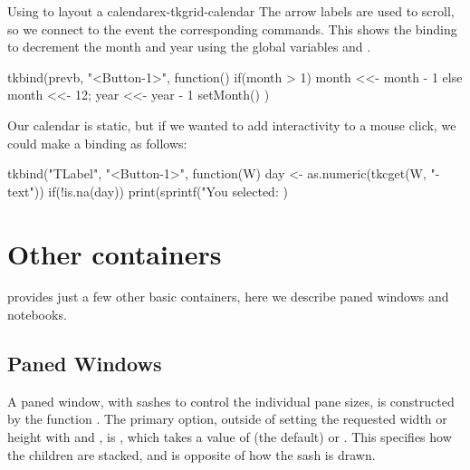 \begin{example}{Using  to layout a calendar}{ex-tkgrid-calendar}
The arrow labels are used to scroll, so we connect to the
 event the corresponding commands. This shows the
binding to decrement the month and year using the global variables
 and .
\begin{Schunk}
\begin{Sinput}
 tkbind(prevb, "<Button-1>", function() {
   if(month > 1) {
     month <<- month - 1
   } else {
     month <<- 12; year <<- year - 1
   }
   setMonth()
 })
\end{Sinput}
\end{Schunk}


Our calendar is static, but if we wanted to add interactivity to a
mouse click, we could make a binding as follows:
  
\begin{Schunk}
\begin{Sinput}
 tkbind("TLabel", "<Button-1>", function(W) {
   day <- as.numeric(tkcget(W, "-text"))
   if(!is.na(day))
     print(sprintf("You selected: %
 })
\end{Sinput}
\end{Schunk}


\end{example}

\section{Other containers}
\label{sec:tcltk:other-containers}
\TK\/ provides just a few other basic containers, here we describe paned windows and notebooks.

\subsection{Paned Windows}
\label{sec:tcltk:paned-windows}

A paned window, with sashes to control the individual pane sizes, is constructed by the function
. The primary option, outside of setting
the requested width or height with  and
, is ,
which takes a value of  (the default) or
. This specifies how the children are stacked, and
is opposite of how the sash is drawn.

